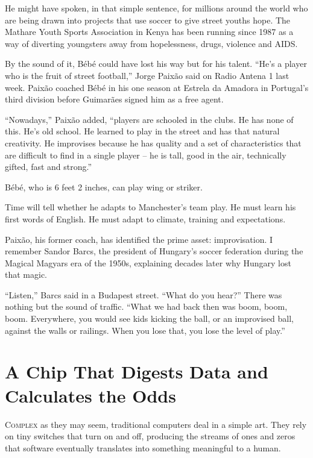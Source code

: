 ﻿\documentclass[12pt]{article}
\begin{document}
He might have spoken, in that simple sentence, for millions around the world who are being drawn
into projects that use soccer to give street youths hope. The Mathare Youth Sports Association in
Kenya has been running since 1987 as a way of diverting youngsters away from hopelessness, drugs,
violence and AIDS.

By the sound of it, B\'eb\'e could have lost his way but for his talent. ``He's a player who is the
fruit of street football,'' Jorge Paixão said on Radio Antena 1 last week. Paixão coached B\'eb\'e
in his one season at Estrela da Amadora in Portugal's third division before Guimarães signed him as
a free agent.

``Nowadays,'' Paixão added, ``players are schooled in the clubs. He has none of this. He's old
school. He learned to play in the street and has that natural creativity. He improvises because he
has quality and a set of characteristics that are difficult to find in a single player -- he is
tall, good in the air, technically gifted, fast and strong.''

B\'eb\'e, who is 6 feet 2 inches, can play wing or striker.

Time will tell whether he adapts to Manchester's team play. He must learn his first words of
English. He must adapt to climate, training and expectations.

Paixão, his former coach, has identified the prime asset: improvisation. I remember Sandor Barcs,
the president of Hungary's soccer federation during the Magical Magyars era of the 1950s, explaining
decades later why Hungary lost that magic.

``Listen,'' Barcs said in a Budapest street. ``What do you hear?'' There was nothing but the sound
of traffic. ``What we had back then was boom, boom, boom. Everywhere, you would see kids kicking the
ball, or an improvised ball, against the walls or railings. When you lose that, you lose the level
of play.''

\section{A Chip That Digests Data and Calculates the Odds}

\lettrine{C}{omplex} as they may seem, traditional computers deal in a
simple art. They rely on tiny switches that turn on and off, producing the streams of ones and zeros
that software eventually translates into something meaningful to a human.
\end{document}
